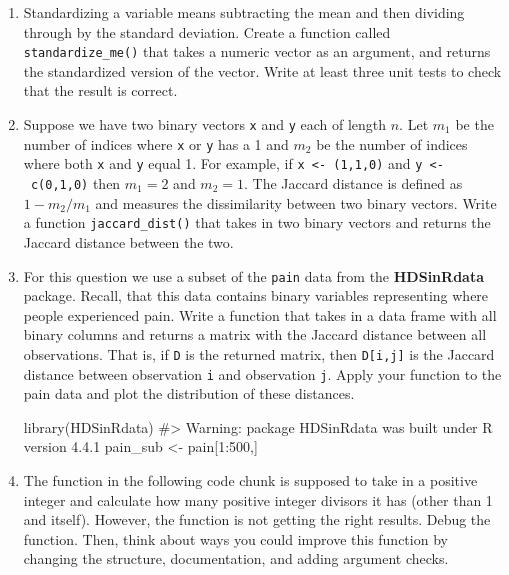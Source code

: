 \documentclass[
  letterpaper,
]{latex/krantz}
\makeatletter
\newenvironment{Shaded}{\begin{snugshade}}{\end{snugshade}}
\newcommand{\CommentTok}[1]{\textcolor[rgb]{0.37,0.37,0.37}{#1}}
\newcommand{\DecValTok}[1]{\textcolor[rgb]{0.68,0.00,0.00}{#1}}
\newcommand{\FunctionTok}[1]{\textcolor[rgb]{0.28,0.35,0.67}{#1}}
\newcommand{\NormalTok}[1]{\textcolor[rgb]{0.00,0.23,0.31}{#1}}
\newcommand{\OtherTok}[1]{\textcolor[rgb]{0.00,0.23,0.31}{#1}}
\newcommand{\SpecialCharTok}[1]{\textcolor[rgb]{0.37,0.37,0.37}{#1}}
\newenvironment{kframe}{%
\medskip{}
\setlength{\fboxsep}{.8em}
 \def\at@end@of@kframe{}%
 \ifinner\ifhmode%
  \def\at@end@of@kframe{\end{minipage}}%
  \begin{minipage}{\columnwidth}%
 \fi\fi%
 \def\FrameCommand##1{\hskip\@totalleftmargin \hskip-\fboxsep
 \colorbox{shadecolor}{##1}\hskip-\fboxsep
     \hskip-\linewidth \hskip-\@totalleftmargin \hskip\columnwidth}%
 \MakeFramed {\advance\hsize-\width
   \@totalleftmargin\z@ \linewidth\hsize
   \@setminipage}}%
 {\par\unskip\endMakeFramed%
 \at@end@of@kframe}
\renewenvironment{Shaded}{\begin{kframe}}{\end{kframe}}
\makeatother
\begin{document}
\begin{enumerate}
\def\labelenumi{\arabic{enumi}.}
\item
  Standardizing a variable means subtracting the mean and then dividing
  through by the standard deviation. Create a function called
  \texttt{standardize\_me()} that takes a numeric vector as an argument,
  and returns the standardized version of the vector. Write at least
  three unit tests to check that the result is correct.
\item
  Suppose we have two binary vectors \texttt{x} and \texttt{y} each of
  length \(n\). Let \(m_{1}\) be the number of indices where \texttt{x}
  or \texttt{y} has a 1 and \(m_2\) be the number of indices where both
  \texttt{x} and \texttt{y} equal 1. For example, if
  \texttt{x\ \textless{}-\ (1,1,0)} and
  \texttt{y\ \textless{}-\ c(0,1,0)} then \(m_1 = 2\) and \(m_2 =1\).
  The Jaccard distance is defined as \(1-m_2/m_1\) and measures the
  dissimilarity between two binary vectors. Write a function
  \texttt{jaccard\_dist()} that takes in two binary vectors and returns
  the Jaccard distance between the two.
\item
  For this question we use a subset of the \texttt{pain} data
   from the \textbf{HDSinRdata}
  package. Recall, that this data contains binary variables representing
  where people experienced pain. Write a function that takes in a data
  frame with all binary columns and returns a matrix with the Jaccard
  distance between all observations. That is, if \texttt{D} is the
  returned matrix, then \texttt{D{[}i,j{]}} is the Jaccard distance
  between observation \texttt{i} and observation \texttt{j}. Apply your
  function to the pain data and plot the distribution of these
  distances.

\begin{Shaded}
\begin{Highlighting}[]
\FunctionTok{library}\NormalTok{(HDSinRdata)}
\CommentTok{\#\textgreater{} Warning: package \textquotesingle{}HDSinRdata\textquotesingle{} was built under R version 4.4.1}
\NormalTok{pain\_sub }\OtherTok{\textless{}{-}}\NormalTok{ pain[}\DecValTok{1}\SpecialCharTok{:}\DecValTok{500}\NormalTok{,]}
\end{Highlighting}
\end{Shaded}
\item
  The function in the following code chunk is supposed to take in a
  positive integer and calculate how many positive integer divisors it
  has (other than 1 and itself). However, the function is not getting
  the right results. Debug the function. Then, think about ways you
  could improve this function by changing the structure, documentation,
  and adding argument checks.


\end{enumerate}
\end{document}
